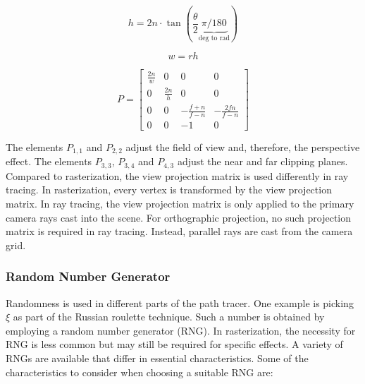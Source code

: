 \begin{equation}
  \label{eqn:perspectiveProjectionHeight}
  h = 2n \cdot \tan(\frac{\theta}{2} \underbrace{\pi / 180}_{\text{deg to rad}})
\end{equation}

\begin{equation}
  \label{eqn:perspectiveProjectionWidth}
  w = rh
\end{equation}

\begin{equation}
  \label{eqn:perspectiveProjectionMatrix}
  P =
  \begin{bmatrix}
    \frac{2n}{w} & 0            & 0                    & 0                  \\
    0            & \frac{2n}{h} & 0                    & 0                  \\
    0            & 0            & -\frac{f + n}{f - n} & -\frac{2fn}{f - n} \\
    0            & 0            & -1                   & 0
  \end{bmatrix}
\end{equation}

The elements $P_{1,1}$ and $P_{2,2}$ adjust the field of view and, therefore, the perspective effect. The elements $P_{3,3}$, $P_{3,4}$ and $P_{4,3}$ adjust the near and far clipping planes. Compared to rasterization, the view projection matrix is used differently in ray tracing. In rasterization, every vertex is transformed by the view projection matrix. In ray tracing, the view projection matrix is only applied to the primary camera rays cast into the scene. For orthographic projection, no such projection matrix is required in ray tracing. Instead, parallel rays are cast from the camera grid.

\subsubsection{Random Number Generator}

Randomness is used in different parts of the path tracer. One example is picking $\xi$ as part of the Russian roulette technique. Such a number is obtained by employing a random number generator (\gls{RNG}). In rasterization, the necessity for \gls{RNG} is less common but may still be required for specific effects. A variety of \glspl{RNG} are available that differ in essential characteristics. Some of the characteristics to consider when choosing a suitable \gls{RNG} are:

